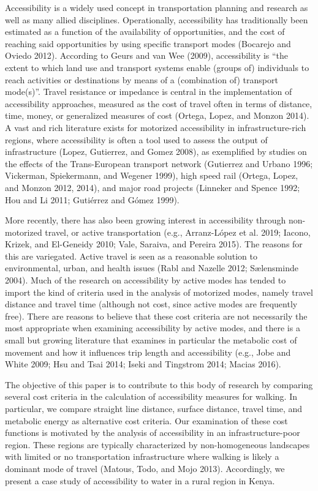 \documentclass[]{elsarticle} %
\begin{document}
Accessibility is a widely used concept in transportation planning and
research as well as many allied disciplines. Operationally,
accessibility has traditionally been estimated as a function of the
availability of opportunities, and the cost of reaching said
opportunities by using specific transport modes (Bocarejo and Oviedo
2012). According to Geurs and van Wee (2009), accessibility is ``the
extent to which land use and transport systems enable (groups of)
individuals to reach activities or destinations by means of a
(combination of) transport mode(s)''. Travel resistance or impedance is
central in the implementation of accessibility approaches, measured as
the cost of travel often in terms of distance, time, money, or
generalized measures of cost (Ortega, Lopez, and Monzon 2014). A vast
and rich literature exists for motorized accessibility in
infrastructure-rich regions, where accessibility is often a tool used to
assess the output of infrastructure (Lopez, Gutierrez, and Gomez 2008),
as exemplified by studies on the effects of the Trans-European transport
network (Gutierrez and Urbano 1996; Vickerman, Spiekermann, and Wegener
1999), high speed rail (Ortega, Lopez, and Monzon 2012, 2014), and major
road projects (Linneker and Spence 1992; Hou and Li 2011; Gutiérrez and
Gómez 1999).

More recently, there has also been growing interest in accessibility
through non-motorized travel, or active transportation (e.g.,
Arranz-López et al. 2019; Iacono, Krizek, and El-Geneidy 2010; Vale,
Saraiva, and Pereira 2015). The reasons for this are variegated. Active
travel is seen as a reasonable solution to environmental, urban, and
health issues (Rabl and Nazelle 2012; Sælensminde 2004). Much of the
research on accessibility by active modes has tended to import the kind
of criteria used in the analysis of motorized modes, namely travel
distance and travel time (although not cost, since active modes are
frequently free). There are reasons to believe that these cost criteria
are not necessarily the most appropriate when examining accessibility by
active modes, and there is a small but growing literature that examines
in particular the metabolic cost of movement and how it influences trip
length and accessibility (e.g., Jobe and White 2009; Hsu and Tsai 2014;
Iseki and Tingstrom 2014; Macias 2016).

The objective of this paper is to contribute to this body of research by
comparing several cost criteria in the calculation of accessibility
measures for walking. In particular, we compare straight line distance,
surface distance, travel time, and metabolic energy as alternative cost
criteria. Our examination of these cost functions is motivated by the
analysis of accessibility in an infrastructure-poor region. These
regions are typically characterized by non-homogeneous landscapes with
limited or no transportation infrastructure where walking is likely a
dominant mode of travel (Matous, Todo, and Mojo 2013). Accordingly, we
present a case study of accessibility to water in a rural region in
Kenya.
\end{document}
